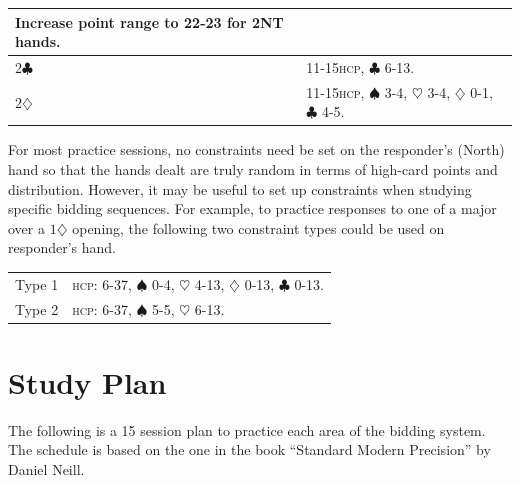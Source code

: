 \documentclass[a4paper,article,oneside]{memoir}
\newcommand{\hcp}{\textsc{hcp}}
\begin{document}
\begin{longtable}{|l|p{10cm}|}
        Increase point range to 22-23 for 2NT hands. \\
  \hline
  $2\clubsuit$ & 11-15\hcp, $\clubsuit$ 6-13. \\
  \hline
  $2\diamondsuit$ & 11-15\hcp, 
                    $\spadesuit$ 3-4,
                    $\heartsuit$ 3-4,
                    $\diamondsuit$ 0-1,
                    $\clubsuit$ 4-5. \\
  \hline
\end{longtable}

For most practice sessions, no constraints need be set on the
responder's (North) hand so that the hands dealt are truly random in
terms of high-card points and distribution. However, it may be useful
to set up constraints when studying specific bidding sequences. For
example, to practice responses to one of a major over a
$1\diamondsuit$ opening, the following two constraint types could be
used on responder's hand.

\begin{longtable}{l|p{10cm}}
  \hline
  Type 1 & \hcp: 6-37,
           $\spadesuit$ 0-4,
           $\heartsuit$ 4-13,
           $\diamondsuit$ 0-13,
           $\clubsuit$ 0-13. \\
  Type 2 & \hcp: 6-37,
           $\spadesuit$ 5-5,
           $\heartsuit$ 6-13. \\
  \hline
\end{longtable}

\section{Study Plan}

The following is a 15 session plan to practice each area of the
bidding system. The schedule is based on the one in the book
``Standard Modern Precision'' by Daniel Neill.
\end{document}
